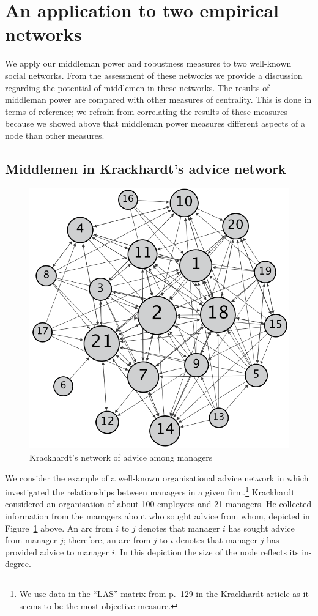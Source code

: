 \documentclass[11pt,fleqn]{article}
\begin{document}
\section{An application to two empirical networks}
\label{sec:empiricalNetwork}

We apply our middleman power and robustness measures to two well-known social networks. From the assessment of these networks we provide a discussion regarding the potential of middlemen in these networks. The results of middleman power are compared with other measures of centrality. This is done in terms of reference; we refrain from correlating the results of these measures because we showed above that middleman power measures different aspects of a node than other measures.

\subsection{Middlemen in Krackhardt's advice network}

\begin{figure}[h]
\centering
\includegraphics[scale=0.45]{Images/krack.png}
\caption{Krackhardt's network of advice among managers}
\label{krackhardtnetwork}
\end{figure}

We consider the example of a well-known organisational advice network in which \citet{Krackhardt1987} investigated the relationships between managers in a given firm.\footnote{We use data in the ``LAS'' matrix from p.~129 in the Krackhardt article as it seems to be the most objective measure.} Krackhardt considered an organisation of about 100 employees and 21 managers. He collected information from the managers about who sought advice from whom, depicted in Figure~\ref{krackhardtnetwork} above. An arc from $i$ to $j$ denotes that manager $i$ has sought advice from manager $j$; therefore, an arc from $j$ to $i$ denotes that manager $j$ has provided advice to manager $i$. In this depiction the size of the node reflects its in-degree.
\end{document}

